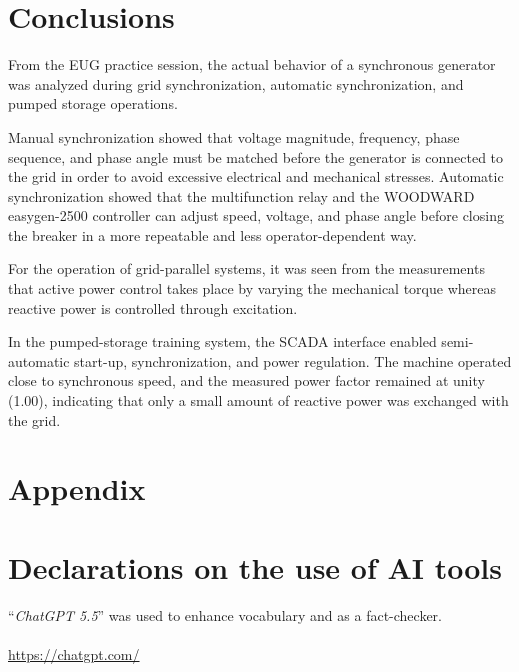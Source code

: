 \documentclass{article}
\begin{document}
\newpage
\section{Conclusions}
From the EUG practice session, the actual behavior of a synchronous
generator was analyzed during grid synchronization, automatic
synchronization, and pumped storage operations.

Manual synchronization showed that voltage magnitude, frequency,
phase sequence, and phase angle must be matched before the generator
is connected to the grid in order to avoid excessive electrical and
mechanical stresses. Automatic synchronization showed that the
multifunction relay and the WOODWARD easygen-2500 controller can
adjust speed, voltage, and phase angle before closing the breaker in
a more repeatable and less operator-dependent way.

For the operation of grid-parallel systems, it was seen from the
measurements that active power control takes place by varying the
mechanical torque whereas reactive power is controlled through
excitation.

In the pumped-storage training system, the SCADA interface enabled
semi-automatic start-up, synchronization, and power regulation.
The machine operated close to synchronous speed, and the measured
power factor remained at unity (1.00), indicating that only a small
amount of reactive power was exchanged with the grid.

\newpage
\appendix
\section{Appendix}

\listoffigures

\listoftables

\printbibliography

\section*{Declarations on the use of AI tools}
``\textit{ChatGPT 5.5}'' was used to enhance vocabulary and as a fact-checker.\\
{}\\
\url{https://chatgpt.com/}
\thispagestyle{fancy}
\end{document}
